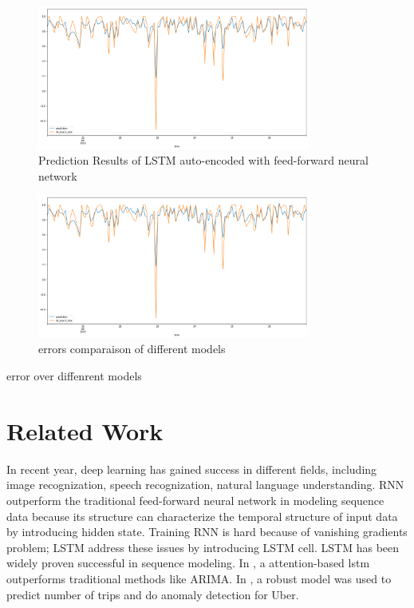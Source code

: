 \documentclass[5p]{elsarticle}
\begin{document}
\begin{figure}[h]
    \centering
    \includegraphics[width=0.8\textwidth]{result.png}
    \caption{Prediction Results of LSTM auto-encoded with feed-forward neural network}
    \label{fig:Prediction Results}
\end{figure}

\begin{figure}[h]
    \centering
    \includegraphics[width=0.8\textwidth]{result.png}
    \caption{errors comparaison of different models}
    \label{fig:Prediction Results}
\end{figure}

error over diffenrent models
 
\section{Related Work}
In recent year, deep learning has gained success in different fields, including image recognization, speech recognization, natural language understanding\cite{Lecun2015}. RNN\cite{Schmidhuber1989} outperform the traditional feed-forward neural network in modeling sequence data because its structure can characterize the temporal structure of input data by introducing hidden state. Training RNN is hard because of vanishing gradients problem; LSTM address these issues by introducing LSTM cell\cite{Hochreiter1997LongMemory}. LSTM has been widely proven successful in sequence modeling. In \cite{Qin}, a attention-based lstm outperforms traditional methods like ARIMA. In \cite{Zhu2017DeepUber}, a robust model was used to predict number of trips and do anomaly detection for Uber. 
\end{document}
